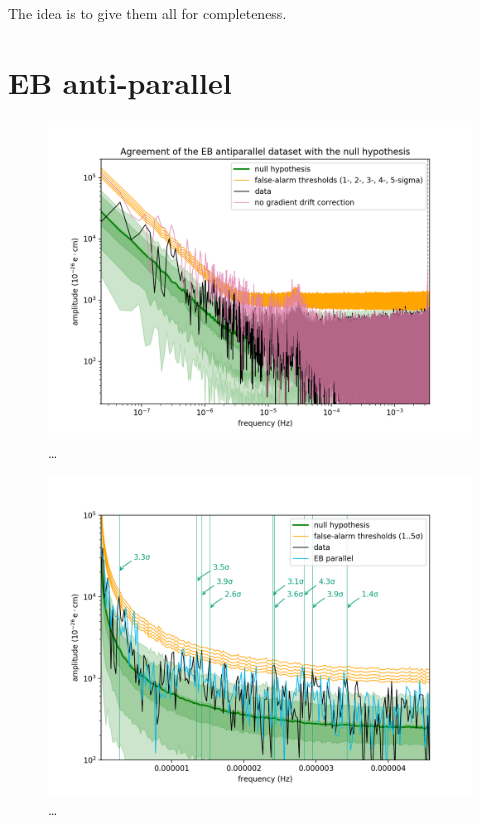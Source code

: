 The idea is to give them all for completeness.



\section{EB anti-parallel}
\begin{figure}
  \centering
  \includegraphics[width=\linewidth]{gfx/axions/AP_detection_and_no_GDC.png}
  \caption{\ldots}
  \label{fig:axions_AP_detection_and_no_GDC}
\end{figure}
\begin{figure}
  \centering
  \includegraphics[width=\linewidth]{gfx/axions/AP_detection_area1.png}
  \caption{\ldots}
  \label{fig:axions_AP_detection_area1}
\end{figure}
